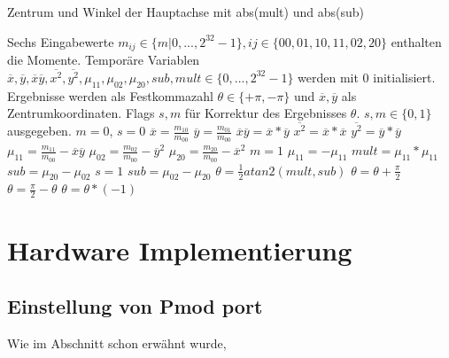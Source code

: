 \documentclass[a4paper]{report}
\begin{document}
\begin{algorithm}
\caption{Zentrum und Winkel der Hauptachse mit abs(mult) und abs(sub)}
\label{Momente}
\begin{algorithmic}[1]
\Require Sechs Eingabewerte {$m_{ij}\in\{m|0,...,2^{32}-1\},ij\in\{00,01,10,11,02,20\}$} enthalten die Momente. Temporäre Variablen $\overline{x},\overline{y},\overline{x}\overline{y},\overline{x^2},\overline{y^2},\mu_{11},\mu_{02},\mu_{20},sub,mult\in \{0,...,2^{32}-1\}$ werden mit 0 initialisiert. Ergebnisse werden als Festkommazahl $\theta \in \{+\pi, -\pi\}$ und  $\overline{x},\overline{y}$ als Zentrumkoordinaten. Flags $s,m$ für Korrektur des Ergebnisses $\theta$. {$s,m\in\{0,1\}$} ausgegeben.
\State $m = 0$, $s = 0$
	\State $\overline{x} = \frac{m_{10}}{m_{00}}$
	\State $\overline{y} = \frac{m_{01}}{m_{00}}$
	\State $\overline{x}\overline{y} = \overline{x} * \overline{y}$
	\State $\overline{x^2} = \overline{x} * \overline{x}$
	\State $\overline{y^2} = \overline{y} * \overline{y}$
	\State $\mu_{11} = \frac{m_{11}}{m_{00}} - \overline{x}\overline{y} $
	\State $\mu_{02} = \frac{m_{02}}{m_{00}} - \overline{y}^2 $
	\State $\mu_{20} = \frac{m_{20}}{m_{00}} - \overline{x}^2 $	
		\State $m = 1$
		\State $\mu_{11} = -\mu_{11}$
	\EndIf
	\State $mult = \mu_{11}* \mu_{11}$
		\State $sub = \mu_{20}-\mu_{02}$
		\State $s = 1$
	\Else
		\State $sub = \mu_{02}-\mu_{20}$
    \EndIf  
	\State $\theta = \frac{1}{2} atan2(mult, sub)$
\EndIf
{}
	\State $\theta = \theta + \frac{\pi}{2}$
	\State $\theta = \frac{\pi}{2} - \theta$
	\State $\theta= \theta*(-1)$
\EndIf  


\end{algorithmic}
\end{algorithm}

\newpage
\section{Hardware Implementierung}

\subsection{Einstellung von Pmod port}
Wie im Abschnitt \textbf{} schon erwähnt wurde, 
\end{document}
